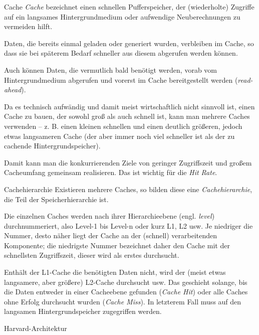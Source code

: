 \begin{defi}{Cache}
  \emph{Cache} bezeichnet einen schnellen Pufferspeicher, der (wiederholte) Zugriffe auf ein langsames Hintergrundmedium oder aufwendige Neuberechnungen zu vermeiden hilft.

  Daten, die bereits einmal geladen oder generiert wurden, verbleiben im Cache, so dass sie bei späterem Bedarf schneller aus diesem abgerufen werden können.

  Auch können Daten, die vermutlich bald benötigt werden, vorab vom Hintergrundmedium abgerufen und vorerst im Cache bereitgestellt werden (\emph{read-ahead}).

  Da es technisch aufwändig und damit meist wirtschaftlich nicht sinnvoll ist, einen Cache zu bauen, der sowohl groß als auch schnell ist, kann man mehrere Caches verwenden -- z. B. einen kleinen schnellen und einen deutlich größeren, jedoch etwas langsameren Cache (der aber immer noch viel schneller ist als der zu cachende Hintergrundspeicher).

  Damit kann man die konkurrierenden Ziele von geringer Zugriffszeit und großem Cacheumfang gemeinsam realisieren.
  Das ist wichtig für die \emph{Hit Rate}.
\end{defi}

\begin{defi}{Cachehierarchie}
  Existieren mehrere Caches, so bilden diese eine \emph{Cachehierarchie}, die Teil der Speicherhierarchie ist.

  Die einzelnen Caches werden nach ihrer Hierarchieebene (engl. \emph{level}) durchnummeriert, also Level-1 bis Level-n oder kurz L1, L2 usw.
  Je niedriger die Nummer, desto näher liegt der Cache an der (schnell) verarbeitenden Komponente;
  die niedrigste Nummer bezeichnet daher den Cache mit der schnellsten Zugriffszeit, dieser wird als erstes durchsucht.

  Enthält der L1-Cache die benötigten Daten nicht, wird der (meist etwas langsamere, aber größere) L2-Cache durchsucht usw.
  Das geschieht solange, bis die Daten entweder in einer Cacheebene gefunden (\emph{Cache Hit}) oder alle Caches ohne Erfolg durchsucht wurden (\emph{Cache Miss}).
  In letzterem Fall muss auf den langsamen Hintergrundspeicher zugegriffen werden.
\end{defi}

\begin{example}[Cachehierarchie]{Harvard-Architektur}
\end{example}

